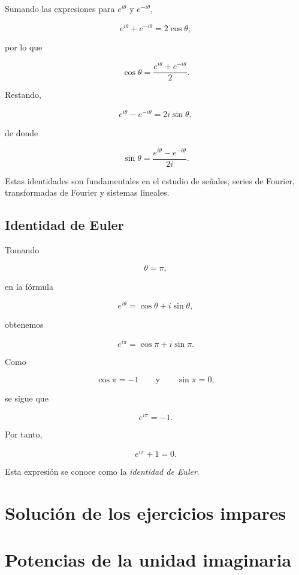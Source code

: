 \documentclass[12pt]{article}
\begin{document}
Sumando las expresiones para \(e^{i\theta}\) y \(e^{-i\theta}\),

\[
e^{i\theta}+e^{-i\theta}
=
2\cos\theta,
\]

por lo que

\[
\boxed{
\cos\theta
=
\frac{e^{i\theta}+e^{-i\theta}}{2}.
}
\]

Restando,

\[
e^{i\theta}-e^{-i\theta}
=
2i\sin\theta,
\]

de donde

\[
\boxed{
\sin\theta
=
\frac{e^{i\theta}-e^{-i\theta}}{2i}.
}
\]

Estas identidades son fundamentales en el estudio de señales, series de
Fourier, transformadas de Fourier y sistemas lineales.


\subsection{Identidad de Euler}

Tomando

\[
\theta=\pi,
\]

en la fórmula

\[
e^{i\theta}
=
\cos\theta+i\sin\theta,
\]

obtenemos

\[
e^{i\pi}
=
\cos\pi+i\sin\pi.
\]

Como

\[
\cos\pi=-1
\qquad\text{y}\qquad
\sin\pi=0,
\]

se sigue que

\[
e^{i\pi}=-1.
\]

Por tanto,

\[
\boxed{
e^{i\pi}+1=0.
}
\]

Esta expresión se conoce como la \emph{identidad de Euler}.

\section*{Solución de los ejercicios impares}

\section*{Potencias de la unidad imaginaria}
\end{document}
